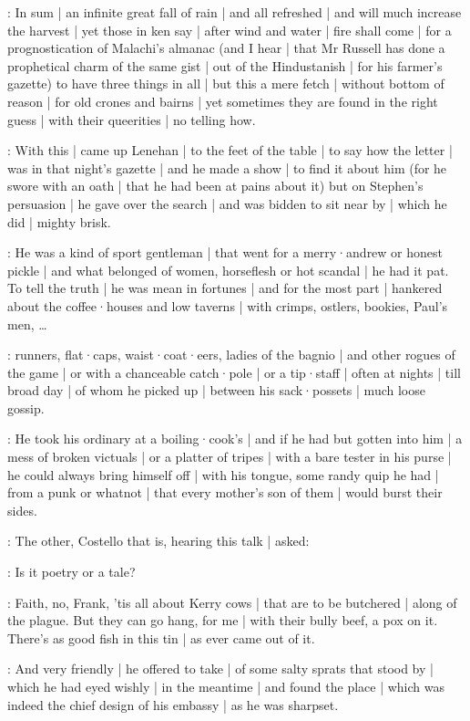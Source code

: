 :
In sum |
an infinite great fall of rain |
and all refreshed |
and will much increase the harvest |
yet those in ken say |
after wind and water |
fire shall come |
for a prognostication of Malachi's almanac
(and I hear |
that Mr Russell has done a prophetical charm of the same gist |
out of the Hindustanish |
for his farmer's gazette)
to have three things in all |
but this a mere fetch |
without bottom of reason |
for old crones and bairns |
yet sometimes they are found in the right guess |
with their queerities |
no telling how.



:
With this |
came up Lenehan |
to the feet of the table |
to say how the letter |
was in that night's gazette |
and he made a show |
to find it about him
(for he swore with an oath |
that he had been at pains about it)
but on Stephen's persuasion |
he gave over the search |
and was bidden to sit near by |
which he did |
mighty brisk.

:
He was a kind of sport gentleman |
that went for a merry·andrew or honest pickle |
and what belonged of women,
horseflesh or hot scandal |
he had it pat.
To tell the truth |
he was mean in fortunes |
and for the most part |
hankered about the coffee·houses and low taverns |
with crimps,
ostlers,
bookies,
Paul's men,
\dots

:
runners,
flat·caps,
waist·coat·eers,
ladies of the bagnio |
and other rogues of the game |
or with a chanceable catch·pole |
or a tip·staff |
often at nights |
till broad day |
of whom he picked up |
between his sack·possets |
much loose gossip.

:
He took his ordinary at a boiling·cook's |
and if he had but gotten into him |
a mess of broken victuals |
or a platter of tripes |
with a bare tester in his purse |
he could always bring himself off |
with his tongue,
some randy quip he had |
from a punk or whatnot |
that every mother's son of them |
would burst their sides.

:
The other,
Costello that is,
hearing this talk |
asked:

\punch:
Is it poetry or a tale?

\lenehan:
Faith,
no,
Frank,
'tis all about Kerry cows |
that are to be butchered |
along of the plague.
But they can go hang,
for me |
with their bully beef,
a pox on it.
There's as good fish in this tin |
as ever came out of it.

:
And very friendly |
he offered to take |
of some salty sprats that stood by |
which he had eyed wishly |
in the meantime |
and found the place |
which was indeed the chief design of his embassy |
as he was sharpset.


